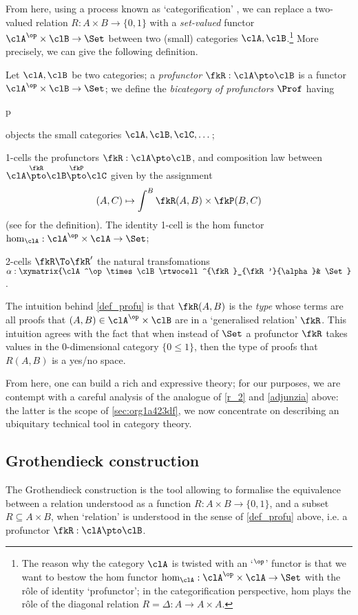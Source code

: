 From here, using a process known as `categorification' \cite{baez_catego}, we can replace a two-valued relation $R : A\times B \to \{0,1\}$ with a \emph{set-valued} functor $\clA^\op\times\clB \to \Set$ between two (small) categories $\clA,\clB$.\footnote{The reason why the category $\clA$ is twisted with an `$^\op$' functor is that we want to bestow the hom functor $\hom_{\clA} : \clA^\op\times\clA \to \Set$ with the r\^ole of identity `profunctor'; in the categorification perspective, hom plays the r\^ole of the diagonal relation $R=\Delta : A\to A\times A$.} More precisely, we can give the following definition.
\begin{definition}[Profunctor]\label{def_profu}
	Let $\clA,\clB$ be two categories; a \emph{profunctor} $\fkR : \clA \pto \clB$ is a functor $\clA^\op\times\clB \to \Set$; we define the \emph{bicategory of profunctors} $\Prof$ having
	\begin{enumtag}{p}
		\item objects the small categories $\clA,\clB,\clC,\dots$;
		\item 1-cells the profunctors $\fkR : \clA \pto \clB$, and composition law between $\clA \overset{\fkR}{\pto} \clB \overset{\fkP}{\pto} \clC$ given by the assignment
		\[ (A,C)\mapsto \int^B \fkR(A,B)\times\fkP(B,C) \]
		(see \cite{} for the definition). The identity 1-cell is the hom functor $\hom_\clA : \clA^\op\times\clA \to \Set$;
		\item 2-cells $\fkR\To\fkR'$ the natural transfomations $\alpha : \xymatrix{\clA^\op\times\clB \rtwocell^{\fkR}_{\fkR'}{\alpha}& \Set}$.
	\end{enumtag}
\end{definition}
The intuition behind \autoref{def_profu} is that $\fkR(A,B)$ is the \emph{type} whose terms are all proofs that $(A,B)\in\clA^\op\times\clB$ are in a  `generalised relation' $\fkR$. This intuition agrees with the fact that when instead of $\Set$ a profunctor $\fkR$ takes values in the 0-dimensional category $\{0\le 1\}$, then the type of proofs that $R(A,B)$ is a yes/no space.

From here, one can build a rich and expressive theory; for our purposes, we are contempt with a careful analysis of the analogue of \ref{r_2} and \eqref{adjunzia} above: the latter is the scope of \autoref{sec:org1a423df}, we now concentrate on describing an ubiquitary technical tool in category theory.
\subsection{Grothendieck construction}
The Grothendieck construction is the tool allowing to formalise the equivalence between a relation understood as a function $R : A\times B \to \{0,1\}$, and a subset $R\subseteq A\times B$, when `relation' is understood in the sense of \autoref{def_profu} above, i.e. a profunctor $\fkR : \clA \pto \clB$.

